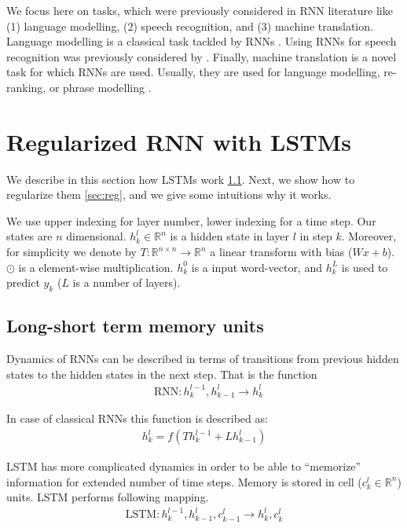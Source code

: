 \documentclass{article}
\begin{document}
We focus here on tasks, which were previously considered in RNN literature like (1)
language modelling, (2) speech recognition, and (3) machine translation. 
Language modelling is a classical task tackled by
RNNs \cite{pascanu2013construct, mikolov2010recurrent, mikolov2011strategies}.
Using RNNs for speech recognition was previously 
considered by \cite{robinson1996use, graves2013speech}. Finally, machine translation
is a novel task for which RNNs are used. Usually, they are used for language modelling, 
re-ranking, or phrase modelling \cite{cho2014learning}.

\section{Regularized RNN with LSTMs}

We describe in this section how LSTMs work \ref{sec:lstm}. Next, 
we show how to regularize them \ref{sec:reg}, and we give some intuitions
why it works.


We use upper indexing for layer number, lower indexing for a time step. 
Our states are $n$ dimensional.
$h^l_k \in \mathbb{R}^{n}$ is a hidden state in layer $l$ in step $k$. Moreover, for simplicity
we denote by $T:\mathbb{R}^{n \times n} \rightarrow \mathbb{R}^{n}$ a 
linear transform with bias ($Wx + b$).
$\odot$ is a element-wise multiplication. $h^0_k$ is a input word-vector, 
and $h^{L}_k$ is used to predict $y_k$ ($L$ is a number of layers).


\subsection{Long-short term memory units}
\label{sec:lstm}

Dynamics of RNNs can be described in terms of transitions
from previous hidden states to the hidden states in the next step. 
That is the function 
\begin{align*}
  &\text{RNN} : h^{l-1}_k, h^l_{k-1} \rightarrow h^l_k
\end{align*}

In case of classical RNNs this function is described as: 
\begin{align*}
  h^l_k = f(Th^{l-1}_k + Lh^l_{k-1})
\end{align*}

LSTM has more complicated dynamics in order to be able to 
``memorize'' information for extended number of time steps. 
Memory is stored in cell ($c^l_k \in \mathbb{R}^n$) units. LSTM performs following mapping.
\begin{align*}
\text{LSTM} : h^{l-1}_k, h^l_{k-1}, c^l_{k - 1} \rightarrow h^l_k, c^l_k
\end{align*}
\end{document}
